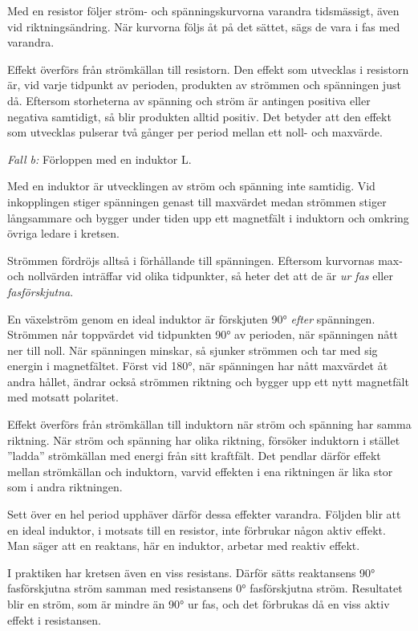Med en resistor följer ström- och spänningskurvorna varandra tidsmässigt, även
vid riktningsändring. När kurvorna följs åt på det sättet, sägs de vara i fas
med varandra.

Effekt överförs från strömkällan till resistorn. Den effekt som utvecklas i
resistorn är, vid varje tidpunkt av perioden, produkten av strömmen och
spänningen just då. Eftersom storheterna av spänning och ström är antingen
positiva eller negativa samtidigt, så blir produkten alltid positiv. Det betyder
att den effekt som utvecklas pulserar två gånger per period mellan ett noll- och
maxvärde.

\emph{Fall b:} Förloppen med en induktor L.

Med en induktor är utvecklingen av ström och spänning inte samtidig. Vid
inkopplingen stiger spänningen genast till maxvärdet medan strömmen stiger
långsammare och bygger under tiden upp ett magnetfält i induktorn och omkring
övriga ledare i kretsen.

Strömmen fördröjs alltså i förhållande till spänningen. Eftersom kurvornas max-
och nollvärden inträffar vid olika tidpunkter, så heter det att de är
\emph{ur fas} eller \emph{fasförskjutna}.

En växelström genom en ideal induktor är förskjuten 90° \emph{efter}
spänningen. Strömmen når toppvärdet vid tidpunkten 90° av perioden, när
spänningen nått ner till noll. När spänningen minskar, så sjunker strömmen och
tar med sig energin i magnetfältet. Först vid 180°, när spänningen har nått
maxvärdet åt andra hållet, ändrar också strömmen riktning och bygger upp ett
nytt magnetfält med motsatt polaritet.

Effekt överförs från strömkällan till induktorn när ström och spänning har samma
riktning. När ström och spänning har olika riktning, försöker induktorn i
stället ''ladda'' strömkällan med energi från sitt kraftfält. Det pendlar därför
effekt mellan strömkällan och induktorn, varvid effekten i ena riktningen är
lika stor som i andra riktningen.

Sett över en hel period upphäver därför dessa effekter varandra. Följden blir
att en ideal induktor, i motsats till en resistor, inte förbrukar någon aktiv
effekt. Man säger att en reaktans, här en induktor, arbetar med reaktiv effekt.

I praktiken har kretsen även en viss resistans. Därför sätts reaktansens 90°
fasförskjutna ström samman med resistansens 0° fasförskjutna ström. Resultatet
blir en ström, som är mindre än 90° ur fas, och det förbrukas då en viss aktiv
effekt i resistansen.


